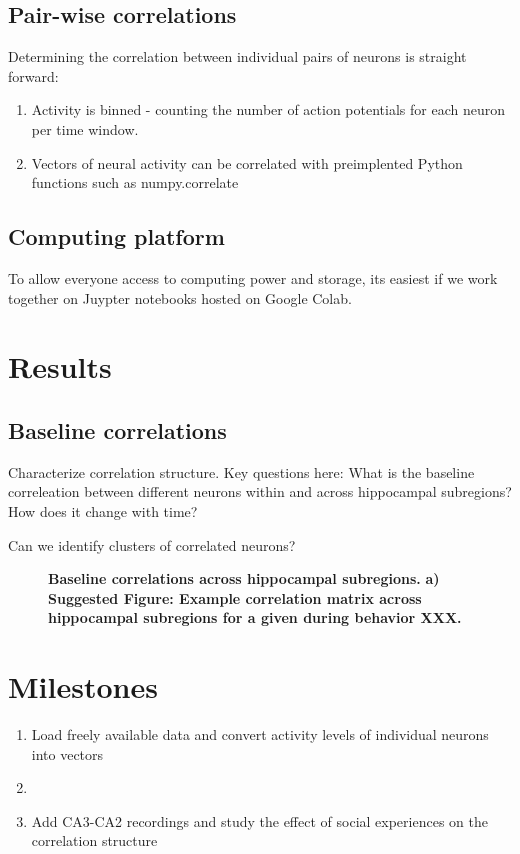 \documentclass{article}
\begin{document}
\subsection{Pair-wise correlations}
Determining the correlation between individual pairs of neurons is straight forward: 
\begin{enumerate}
    \item Activity is binned - counting the number of action potentials for each neuron per time window.
    \item Vectors of neural activity can be correlated with preimplented Python functions such as numpy.correlate
\end{enumerate} 

\subsection{Computing platform}
To allow everyone access to computing power and storage, its easiest if we work together on Juypter notebooks hosted on Google Colab.

\section{Results}
\subsection{Baseline correlations}
Characterize correlation structure. Key questions here: What is the baseline correleation between different neurons within and across hippocampal subregions? How does it change with time?

Can we identify clusters of correlated neurons? 

\begin{figure}[H]
 \centering
  \begin{subfigure}[b]{0.29\textwidth}
     \centering
     
     \caption{}
     \label{fig:SeqComp_ActivationFunction}
 \end{subfigure}
 \hfill     
    \caption{
    \textbf{Baseline correlations across hippocampal subregions.}
    \textbf{a) Suggested Figure: Example correlation matrix across hippocampal subregions for a given during behavior XXX.  }
}
    \label{fig:SeqComp_SingleSequence}
\end{figure}


\section{Milestones}
\begin{enumerate}
    \item Load freely available data and convert activity levels of individual neurons into vectors
    \item 
    \item Add CA3-CA2 recordings and study the effect of social experiences on the correlation structure
\end{enumerate}


\end{document}
